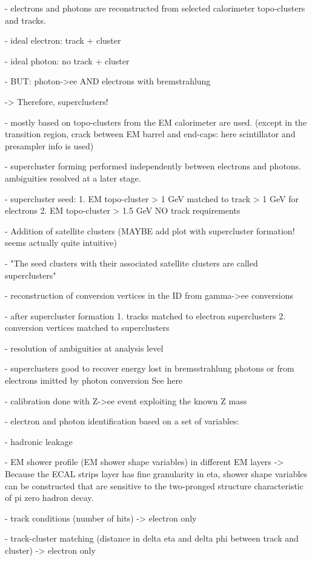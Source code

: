 - electrons and photons are reconstructed from selected calorimeter topo-clusters and tracks.

- ideal electron: track + cluster

- ideal photon: no track + cluster

- BUT: photon->ee AND electrons with bremstrahlung

-> Therefore, superclusters!

- mostly based on topo-clusters from the EM calorimeter are used. (except in the transition region, crack between EM barrel and end-caps: here scintillator and presampler info is used)

- supercluster forming performed independently between electrons and photons. ambiguities resolved at a later stage.

- supercluster seed:
1. EM topo-cluster > 1 GeV matched to track > 1 GeV for electrons
2. EM topo-cluster > 1.5 GeV NO track requirements

- Addition of satellite clusters (MAYBE add plot with supercluster formation! seems actually quite intuitive)

- "The seed clusters with their associated satellite clusters are called superclusters"

- reconstruction of conversion vertices in the ID from gamma->ee conversions

- after supercluster formation
1. tracks matched to electron superclusters
2. conversion vertices matched to superclusters

- resolution of ambiguities at analysis level

- superclusters good to recover energy lost in bremsstrahlung photons or from electrons imitted by photon conversion
See here

- calibration done with Z->ee event exploiting the known Z mass

- electron and photon identification based on a set of variables:

- hadronic leakage

- EM shower profile (EM shower shape variables) in different EM layers
-> Because the ECAL strips layer has fine granularity in eta, shower shape variables can be constructed that are sensitive to the two-pronged structure characteristic of pi zero hadron decay.

- track conditions (number of hits) -> electron only

- track-cluster matching (distance in delta eta and delta phi between track and cluster) -> electron only

